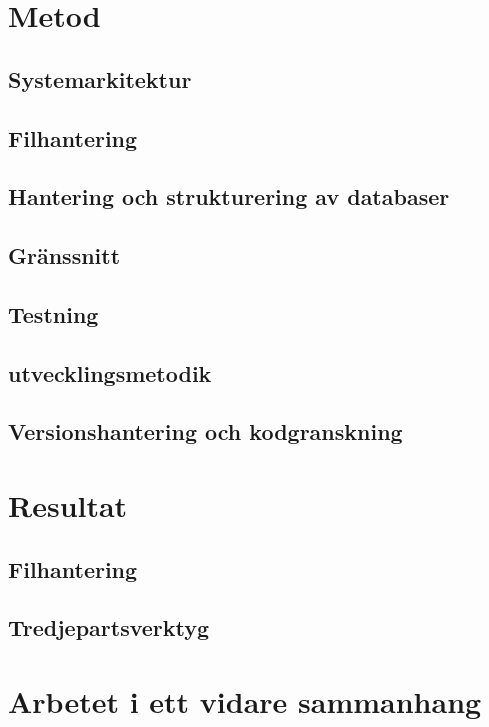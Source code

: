 \documentclass[a4paper,12pt,oneside,final]{extbook}
\begin{document}
\section{Metod}

\subsection{Systemarkitektur}

\subsection{Filhantering}

\subsection{Hantering och strukturering av databaser}

\subsection{Gränssnitt}

\subsection{Testning}

\subsection{utvecklingsmetodik}

\subsection{Versionshantering och kodgranskning}

\section{Resultat}

\subsection{Filhantering}

\subsection{Tredjepartsverktyg}

\section{Arbetet i ett vidare sammanhang}
\end{document}
